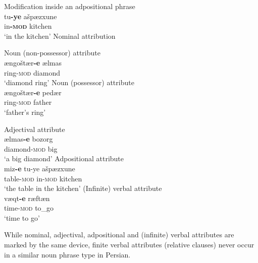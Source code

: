\begin{exe}
\ex 
{}\label{multi persian}
\begin{xlist}
\ex \textrm{Modification inside an adpositional phrase}\\
\gll	tu\textbf{-ye} ašpæzxune\\
	in\textbf{-\textsc{mod}} kitchen\\
\glt ‘in the kitchen’
\ex \textrm{Nominal attribution}
\begin{xlist}
\ex \textrm{Noun (non-possessor) attribute}\\
\gll 	ængoštær\textbf{-e} ælmas\\
	ring-\textsc{mod} diamond\\
\glt 	‘diamond ring’
\ex \textrm{Noun (possessor) attribute}\\
\gll	ængoštær\textbf{-e} pedær\\
	ring-\textsc{mod} father\\
\glt	‘father's ring’
\end{xlist}
\ex \textrm{Adjectival attribute}\\
\gll	ælmas\textbf{-e} bozorg\\
	diamond-\textsc{mod} big\\
\glt	‘a big diamond’
\ex \textrm{Adpositional attribute}\\
\gll	miz\textbf{-e} tu{-ye} ašpæzxune\\
	table-\textsc{mod} in{-\textsc{mod}} kitchen\\
\glt ‘the table in the kitchen’
\ex \textrm{(Infinite) verbal attribute}\\
\gll	væqt\textbf{-e} ræftæn\\
	time-\textsc{mod} to\_go\\
\glt	‘time to go’
\end{xlist}
\end{exe}
While nominal, adjectival, adpositional and (infinite) verbal attributes are marked by the same device, finite verbal attributes (relative clauses) never occur in a similar noun phrase type in Persian.

